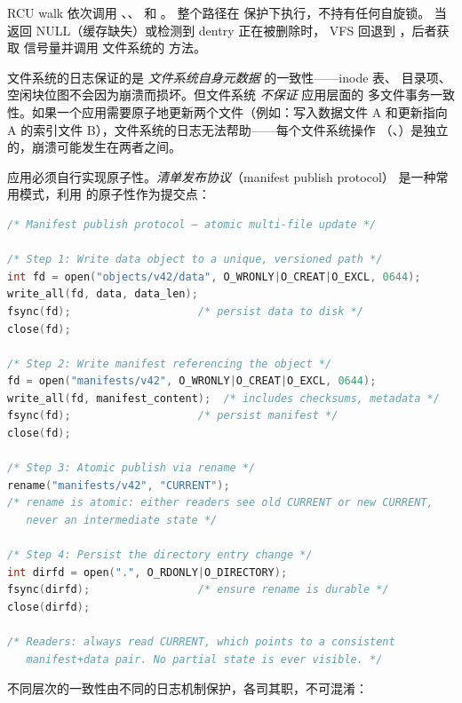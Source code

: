 \begin{filesystemlayout}
RCU walk 依次调用 、、
 和 。
整个路径在  保护下执行，不持有任何自旋锁。
当  返回 NULL（缓存缺失）或检测到 dentry 正在被删除时，
VFS 回退到 ，后者获取  信号量并调用
文件系统的  方法。


文件系统的日志保证的是 \emph{文件系统自身元数据} 的一致性——inode 表、
目录项、空闲块位图不会因为崩溃而损坏。但文件系统 \emph{不保证} 应用层面的
多文件事务一致性。如果一个应用需要原子地更新两个文件（例如：写入数据文件
A 和更新指向 A 的索引文件 B），文件系统的日志无法帮助——每个文件系统操作
（、）是独立的，崩溃可能发生在两者之间。

应用必须自行实现原子性。\emph{清单发布协议}（manifest publish protocol）
是一种常用模式，利用  的原子性作为提交点：

\begin{lstlisting}[language=C]
/* Manifest publish protocol — atomic multi-file update */

/* Step 1: Write data object to a unique, versioned path */
int fd = open("objects/v42/data", O_WRONLY|O_CREAT|O_EXCL, 0644);
write_all(fd, data, data_len);
fsync(fd);                    /* persist data to disk */
close(fd);

/* Step 2: Write manifest referencing the object */
fd = open("manifests/v42", O_WRONLY|O_CREAT|O_EXCL, 0644);
write_all(fd, manifest_content);  /* includes checksums, metadata */
fsync(fd);                    /* persist manifest */
close(fd);

/* Step 3: Atomic publish via rename */
rename("manifests/v42", "CURRENT");
/* rename is atomic: either readers see old CURRENT or new CURRENT,
   never an intermediate state */

/* Step 4: Persist the directory entry change */
int dirfd = open(".", O_RDONLY|O_DIRECTORY);
fsync(dirfd);                 /* ensure rename is durable */
close(dirfd);

/* Readers: always read CURRENT, which points to a consistent
   manifest+data pair. No partial state is ever visible. */
\end{lstlisting}

\begin{keyidea}
不同层次的一致性由不同的日志机制保护，各司其职，不可混淆：


\end{keyidea}
\end{filesystemlayout}
